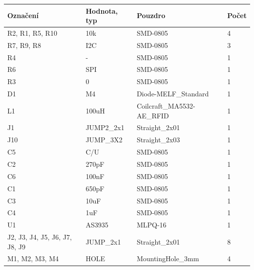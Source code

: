\begin{center}
  \begin{tabular}{ | l | l | l | l |}
    \hline
    Označení & Hodnota, typ & Pouzdro & Počet \\ \hline
    \hline
			R2, R1, R5, R10 & 10k & SMD-0805 & 4\\ \hline
			R7, R9, R8 & I2C & SMD-0805 & 3\\ \hline
			R4 & - & SMD-0805 & 1\\ \hline
			R6 & SPI & SMD-0805 & 1\\ \hline
			R3 & 0 & SMD-0805 & 1\\ \hline
			D1 & M4 & Diode-MELF\_Standard & 1\\ \hline
			L1 & 100uH & Coilcraft\_MA5532-AE\_RFID & 1\\ \hline
			J1 & JUMP2\_2x1 & Straight\_2x01 & 1\\ \hline
			J10 & JUMP\_3X2 & Straight\_2x03 & 1\\ \hline
			C5 & C/U & SMD-0805 & 1\\ \hline
			C2 & 270pF & SMD-0805 & 1\\ \hline
			C6 & 100nF & SMD-0805 & 1\\ \hline
			C1 & 650pF & SMD-0805 & 1\\ \hline
			C3 & 10uF & SMD-0805 & 1\\ \hline
			C4 & 1uF & SMD-0805 & 1\\ \hline
			U1 & AS3935 & MLPQ-16 & 1\\ \hline
			J2, J3, J4, J5, J6, J7, J8, J9 & JUMP\_2x1 & Straight\_2x01 & 8\\ \hline
			M1, M2, M3, M4 & HOLE & MountingHole\_3mm & 4\\ \hline
	
  \end{tabular}
\end{center}